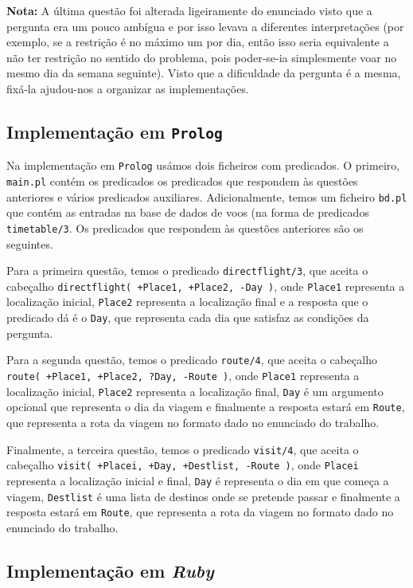 \documentclass[12pt,a4paper,oneside]{article}
\begin{document}
\textbf{Nota:} A última questão foi alterada ligeiramente do enunciado
visto que a pergunta era um pouco ambígua e por isso levava a
diferentes interpretações (por exemplo, se a restrição é no máximo um
por dia, então isso seria equivalente a não ter restrição no sentido
do problema, pois poder-se-ia simplesmente voar no mesmo dia da semana
seguinte). Visto que a dificuldade da pergunta é a mesma, fixá-la
ajudou-nos a organizar as implementações.

\subsection{Implementação em \texttt{Prolog}}

Na implementação em \texttt{Prolog} usámos dois ficheiros com
predicados. O primeiro, \texttt{main.pl} contém os predicados os
predicados que respondem às questões anteriores e vários predicados
auxiliares. Adicionalmente, temos um ficheiro \texttt{bd.pl} que
contém as entradas na base de dados de voos (na forma de predicados
\texttt{timetable/3}. Os predicados que respondem às questões
anteriores são os seguintes.

Para a primeira questão, temos o predicado \texttt{directflight/3}, que
aceita o cabeçalho \texttt{directflight( +Place1, +Place2, -Day )}, onde
\texttt{Place1} representa a localização inicial, \texttt{Place2}
representa a localização final e a resposta que o predicado dá é o
\texttt{Day}, que representa cada dia que satisfaz as condições da
pergunta.

Para a segunda questão, temos o predicado \texttt{route/4}, que aceita
o cabeçalho \texttt{route( +Place1, +Place2, ?Day, -Route )}, onde
\texttt{Place1} representa a localização inicial, \texttt{Place2}
representa a localização final, \texttt{Day} é um argumento opcional
que representa o dia da viagem e finalmente a resposta estará em
\texttt{Route}, que representa a rota da viagem no formato dado no
enunciado do trabalho.

Finalmente, a terceira questão, temos o predicado \texttt{visit/4},
que aceita o cabeçalho \texttt{visit( +Placei, +Day, +Destlist,
  -Route )}, onde \texttt{Placei} representa a localização inicial e
final, \texttt{Day} é representa o dia em que começa a viagem,
\texttt{Destlist} é uma lista de destinos onde se pretende passar e
finalmente a resposta estará em \texttt{Route}, que representa a rota
da viagem no formato dado no enunciado do trabalho.

\subsection{Implementação em \textit{Ruby}}
\end{document}
